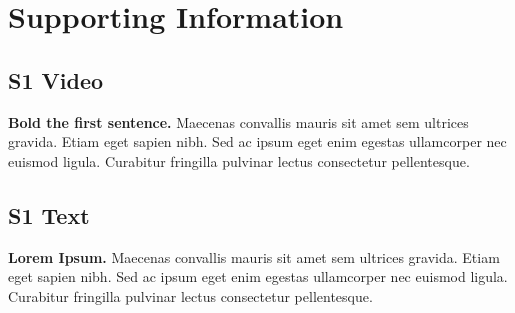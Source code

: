 \documentclass[10pt,letterpaper]{article}
\begin{document}


\section*{Supporting Information}

\subsection*{S1 Video}
\label{S1_Video}
{\bf Bold the first sentence.}  Maecenas convallis mauris sit amet sem ultrices gravida. Etiam eget sapien nibh. Sed ac ipsum eget enim egestas ullamcorper nec euismod ligula. Curabitur fringilla pulvinar lectus consectetur pellentesque.

\subsection*{S1 Text}
\label{S1_Text}
{\bf Lorem Ipsum.} Maecenas convallis mauris sit amet sem ultrices gravida. Etiam eget sapien nibh. Sed ac ipsum eget enim egestas ullamcorper nec euismod ligula. Curabitur fringilla pulvinar lectus consectetur pellentesque.
\end{document}
